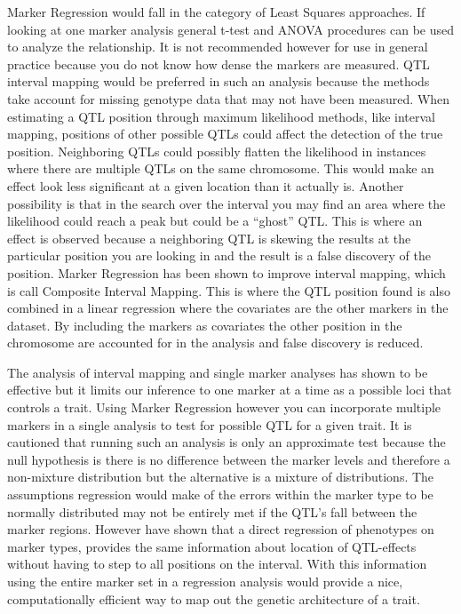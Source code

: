 \documentclass[11pt,]{book}
\theoremstyle{definition}
\theoremstyle{definition}
\theoremstyle{remark}
\begin{document}
Marker Regression would fall in the category of Least Squares
approaches. If looking at one marker analysis general t-test and ANOVA
procedures can be used to analyze the relationship. It is not
recommended however for use in general practice because you do not know
how dense the markers are measured. QTL interval mapping would be
preferred in such an analysis because the methods take account for
missing genotype data that may not have been measured. When estimating a
QTL position through maximum likelihood methods, like interval mapping,
positions of other possible QTLs could affect the detection of the true
position. Neighboring QTLs could possibly flatten the likelihood in
instances where there are multiple QTLs on the same chromosome. This
would make an effect look less significant at a given location than it
actually is. Another possibility is that in the search over the interval
you may find an area where the likelihood could reach a peak but could
be a ``ghost'' QTL. This is where an effect is observed because a
neighboring QTL is skewing the results at the particular position you
are looking in and the result is a false discovery of the position.
Marker Regression has been shown to improve interval mapping, which is
call Composite Interval Mapping. This is where the QTL position found is
also combined in a linear regression where the covariates are the other
markers in the dataset. By including the markers as covariates the other
position in the chromosome are accounted for in the analysis and false
discovery is reduced.

The analysis of interval mapping and single marker analyses has shown to
be effective but it limits our inference to one marker at a time as a
possible loci that controls a trait. Using Marker Regression however you
can incorporate multiple markers in a single analysis to test for
possible QTL for a given trait. It is cautioned that running such an
analysis is only an approximate test because the null hypothesis is
there is no difference between the marker levels and therefore a
non-mixture distribution but the alternative is a mixture of
distributions. The assumptions regression would make of the errors
within the marker type to be normally distributed may not be entirely
met if the QTL's fall between the marker regions. However
\cite{whittaker1996mapping} have shown that a direct regression of
phenotypes on marker types, provides the same information about location
of QTL-effects without having to step to all positions on the interval.
With this information using the entire marker set in a regression
analysis would provide a nice, computationally efficient way to map out
the genetic architecture of a trait.
\end{document}
